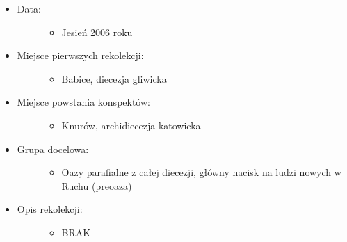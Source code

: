 \documentclass[a5paper,10pt,polish]{book}
\begin{document}
\begin{itemize}
\item {} \begin{description}
\item[{Data:}] \leavevmode\begin{itemize}
\item {} 
Jesień 2006 roku

\end{itemize}

\end{description}

\item {} \begin{description}
\item[{Miejsce pierwszych rekolekcji:}] \leavevmode\begin{itemize}
\item {} 
Babice, diecezja gliwicka

\end{itemize}

\end{description}

\item {} \begin{description}
\item[{Miejsce powstania konspektów:}] \leavevmode\begin{itemize}
\item {} 
Knurów, archidiecezja katowicka

\end{itemize}

\end{description}

\item {} \begin{description}
\item[{Grupa docelowa:}] \leavevmode\begin{itemize}
\item {} 
Oazy parafialne z całej diecezji, główny nacisk na ludzi nowych w Ruchu (preoaza)

\end{itemize}

\end{description}

\item {} \begin{description}
\item[{Opis rekolekcji:}] \leavevmode\begin{itemize}
\item {} 
BRAK

\end{itemize}

\end{description}

\end{itemize}
\end{document}
